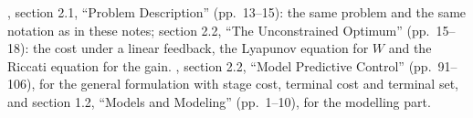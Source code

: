 \begin{reading}
, section 2.1, ``Problem Description'' (pp.~13--15): the same problem and
the same notation as in these notes; section 2.2, ``The Unconstrained Optimum'' (pp.~15--18):
the cost under a linear feedback, the Lyapunov equation for $W$ and the Riccati equation for
the gain. , section 2.2, ``Model Predictive Control'' (pp.~91--106), for
the general formulation with stage cost, terminal cost and terminal set, and section 1.2,
``Models and Modeling'' (pp.~1--10), for the modelling part.
\end{reading}
